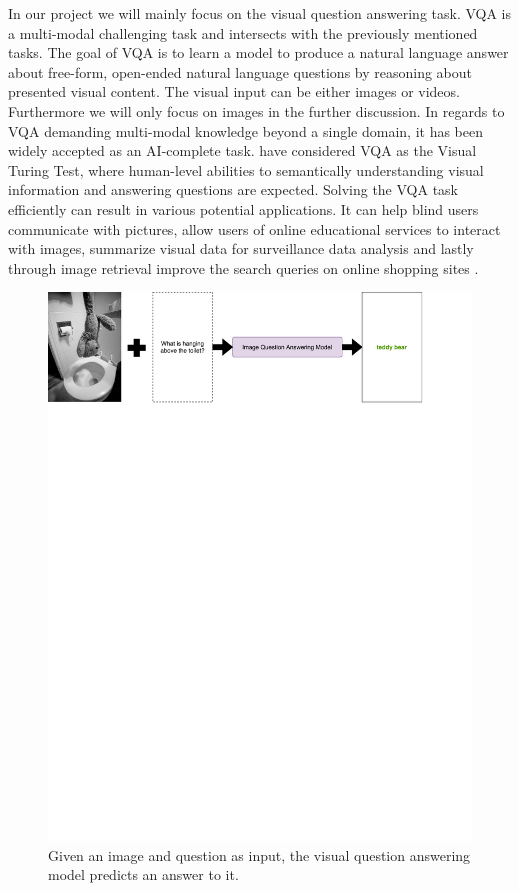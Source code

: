 \documentclass{article}
\begin{document}
In our project we will mainly focus on the visual question answering task. VQA is a  multi-modal challenging task and intersects with the previously mentioned tasks. The goal of VQA is to learn a model to produce a natural language answer about free-form, open-ended natural language questions by reasoning about presented visual content. The visual input can be either images or videos. Furthermore we will only focus on images in the further discussion. In regards to VQA demanding multi-modal knowledge beyond a single domain, it has been widely accepted as an AI-complete task. \cite{geman2015visual} have considered VQA as the Visual Turing Test, where human-level abilities to semantically understanding visual information and answering questions are expected. Solving the VQA task efficiently can result in various potential applications. It can help blind users communicate with pictures, allow users of online educational services to interact with images, summarize visual data for surveillance data analysis and lastly through image retrieval improve the search queries on online shopping sites \citep{manmadhan2020vqa}.

\begin{figure}[H]
	\centering
	\includegraphics[width=\linewidth]{vqa_teddy.pdf}
	\caption{Given an image and question as input, the visual question answering model predicts an answer to it.}
	\label{fig:vqa-graph}
\end{figure}
\end{document}
